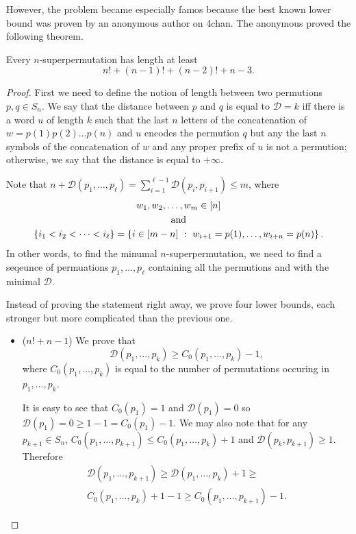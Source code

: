 However, the problem became especially famos because the best known lower bound
was proven by an anonymous author on 4chan. The anonymous proved the following
theorem.
\begin{theorem}
  Every $n$-superpermutation has length at least
  \[
    n! + (n - 1)! + (n - 2)! + n - 3.
  \]
\end{theorem}
\begin{proof}
  First we need to define the notion of length between two permutions
  $p, q \in S_n$. We say that the distance between $p$ and $q$ is equal to
  $\mathcal{D} = k$
  iff there is a word $u$ of length $k$ such that the last $n$ letters of the
  concatenation of  $w = p(1) p(2) \dots p(n)$ and $u$ encodes the permution
  $q$ but any the last $n$ symbols of the concatenation of $w$ and any proper
  prefix of $u$ is not a permution; otherwise, we say that the distance is
  equal to $+\infty$.

  Note that $n + \mathcal{D}(p_1, \dots, p_\ell) =
  \sum_{i = 1}^{\ell - 1} \mathcal{D}(p_i, p_{i + 1}) \le m$, where
  \begin{gather*}
    w_1, w_2, \dots, w_m \in [n] \\
    \text{and} \\
    \set{i_1 < i_2 < \dots < i_\ell} =
    \set[{
      w_{i + 1} = p(1), \dots, w_{i + n} = p(n)
    }]{
      i \in [m - n]
    }.
  \end{gather*}
  In other words, to find the minumal $n$-superpermutation, we need to find
  a seqeunce of permuations $p_1, \dots, p_\ell$ containing all the permutions
  and with the minimal $\mathcal{D}$.

  Instead of proving the statement right away, we prove four lower bounds, each
  stronger but more complicated than the previous one.

  \begin{itemize}
    \item ($n! + n - 1$) We prove that
      \begin{equation}
        \label{equation:inequality-1}
        \mathcal{D}(p_1, \dots, p_k) \ge
        C_0(p_1, \dots, p_k) - 1,
      \end{equation}
      where $C_0(p_1, \dots, p_k)$ is equal to
      the number of permutations occuring in $p_1, \dots, p_k$.

      It is easy to see that $C_0(p_1) = 1$ and $\mathcal{D}(p_1) = 0$ so
      $\mathcal{D}(p_1) = 0 \ge 1 - 1 = C_0(p_1) - 1$. We may also
      note that for any $p_{k + 1} \in S_n$,
      $C_0(p_1, \dots, p_{k + 1}) \le C_0(p_1, \dots, p_k) + 1$ and
      $\mathcal{D}(p_k, p_{k + 1}) \ge 1$. Therefore
      \begin{multline*}
        \mathcal{D}(p_1, \dots, p_{k + 1}) \ge
        \mathcal{D}(p_1, \dots, p_k) + 1 \ge \\
        C_0(p_1, \dots, p_k) + 1 - 1 \ge
        C_0(p_1, \dots, p_{k + 1}) - 1.
      \end{multline*}


\end{itemize}
\end{proof}
